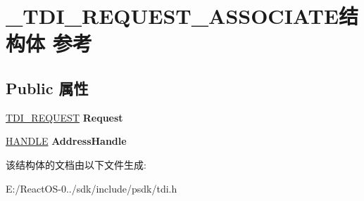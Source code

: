 \hypertarget{struct___t_d_i___r_e_q_u_e_s_t___a_s_s_o_c_i_a_t_e}{}\section{\+\_\+\+T\+D\+I\+\_\+\+R\+E\+Q\+U\+E\+S\+T\+\_\+\+A\+S\+S\+O\+C\+I\+A\+T\+E结构体 参考}
\label{struct___t_d_i___r_e_q_u_e_s_t___a_s_s_o_c_i_a_t_e}
\subsection*{Public 属性}
\begin{DoxyCompactItemize}
\item 
\mbox{\label{struct___t_d_i___r_e_q_u_e_s_t___a_s_s_o_c_i_a_t_e_a8f0d2b08add88e9a173f0b2567408f78}} 
\hyperlink{struct___t_d_i___r_e_q_u_e_s_t}{T\+D\+I\+\_\+\+R\+E\+Q\+U\+E\+ST} {\bfseries Request}
\item 
\mbox{\label{struct___t_d_i___r_e_q_u_e_s_t___a_s_s_o_c_i_a_t_e_a2bcc58cd14f52c0174d0c5e8d30112b5}} 
\hyperlink{interfacevoid}{H\+A\+N\+D\+LE} {\bfseries Address\+Handle}
\end{DoxyCompactItemize}


该结构体的文档由以下文件生成\+:\begin{DoxyCompactItemize}
\item 
E\+:/\+React\+O\+S-\/0../sdk/include/psdk/tdi.\+h\end{DoxyCompactItemize}
